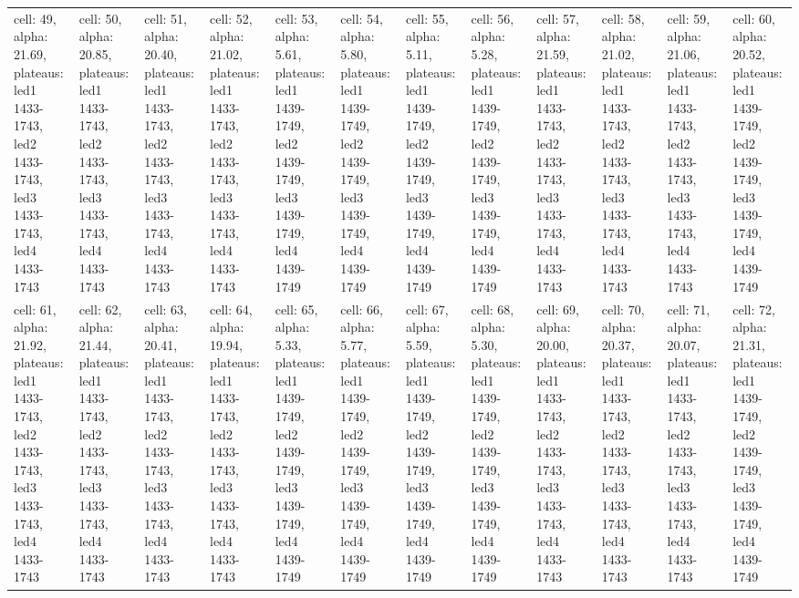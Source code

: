 \begin{landscape}
\begin{longtable}{|l|l|l|l|l|l|l|l|l|l|l|l|}
\rowcolor{lightgray} cell: 49, alpha: 21.69, plateaus: led1 1433-1743, led2 1433-1743, led3 1433-1743, led4 1433-1743 &cell: 50, alpha: 20.85, plateaus: led1 1433-1743, led2 1433-1743, led3 1433-1743, led4 1433-1743 &cell: 51, alpha: 20.40, plateaus: led1 1433-1743, led2 1433-1743, led3 1433-1743, led4 1433-1743 &cell: 52, alpha: 21.02, plateaus: led1 1433-1743, led2 1433-1743, led3 1433-1743, led4 1433-1743 &cell: 53, alpha: 5.61, plateaus: led1 1439-1749, led2 1439-1749, led3 1439-1749, led4 1439-1749 &cell: 54, alpha: 5.80, plateaus: led1 1439-1749, led2 1439-1749, led3 1439-1749, led4 1439-1749 &cell: 55, alpha: 5.11, plateaus: led1 1439-1749, led2 1439-1749, led3 1439-1749, led4 1439-1749 &cell: 56, alpha: 5.28, plateaus: led1 1439-1749, led2 1439-1749, led3 1439-1749, led4 1439-1749 &cell: 57, alpha: 21.59, plateaus: led1 1433-1743, led2 1433-1743, led3 1433-1743, led4 1433-1743 &cell: 58, alpha: 21.02, plateaus: led1 1433-1743, led2 1433-1743, led3 1433-1743, led4 1433-1743 &cell: 59, alpha: 21.06, plateaus: led1 1433-1743, led2 1433-1743, led3 1433-1743, led4 1433-1743 &cell: 60, alpha: 20.52, plateaus: led1 1439-1749, led2 1439-1749, led3 1439-1749, led4 1439-1749 \\
cell: 61, alpha: 21.92, plateaus: led1 1433-1743, led2 1433-1743, led3 1433-1743, led4 1433-1743 &cell: 62, alpha: 21.44, plateaus: led1 1433-1743, led2 1433-1743, led3 1433-1743, led4 1433-1743 &cell: 63, alpha: 20.41, plateaus: led1 1433-1743, led2 1433-1743, led3 1433-1743, led4 1433-1743 &cell: 64, alpha: 19.94, plateaus: led1 1433-1743, led2 1433-1743, led3 1433-1743, led4 1433-1743 &cell: 65, alpha: 5.33, plateaus: led1 1439-1749, led2 1439-1749, led3 1439-1749, led4 1439-1749 &cell: 66, alpha: 5.77, plateaus: led1 1439-1749, led2 1439-1749, led3 1439-1749, led4 1439-1749 &cell: 67, alpha: 5.59, plateaus: led1 1439-1749, led2 1439-1749, led3 1439-1749, led4 1439-1749 &cell: 68, alpha: 5.30, plateaus: led1 1439-1749, led2 1439-1749, led3 1439-1749, led4 1439-1749 &cell: 69, alpha: 20.00, plateaus: led1 1433-1743, led2 1433-1743, led3 1433-1743, led4 1433-1743 &cell: 70, alpha: 20.37, plateaus: led1 1433-1743, led2 1433-1743, led3 1433-1743, led4 1433-1743 &cell: 71, alpha: 20.07, plateaus: led1 1433-1743, led2 1433-1743, led3 1433-1743, led4 1433-1743 &cell: 72, alpha: 21.31, plateaus: led1 1439-1749, led2 1439-1749, led3 1439-1749, led4 1439-1749 \\

\end{longtable}
\end{landscape}
